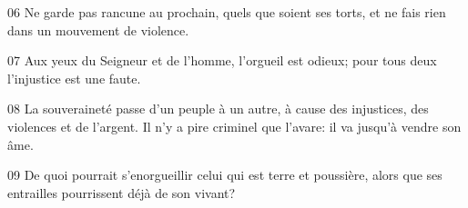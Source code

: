 
06 Ne garde pas rancune au prochain, quels que soient ses torts, et ne fais rien dans un mouvement de violence.

07 Aux yeux du Seigneur et de l’homme, l’orgueil est odieux; pour tous deux l’injustice est une faute.

08 La souveraineté passe d’un peuple à un autre, à cause des injustices, des violences et de l’argent. Il n’y a pire criminel que l’avare: il va jusqu’à vendre son âme.

09 De quoi pourrait s’enorgueillir celui qui est terre et poussière, alors que ses entrailles pourrissent déjà de son vivant?
